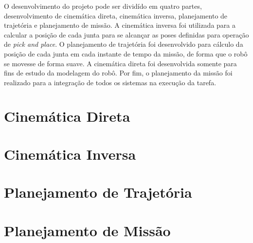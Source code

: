 O desenvolvimento do projeto pode ser dividído em quatro partes, desenvolvimento de 
cinemática direta, cinemática inversa, planejamento de trajetória e planejamento de 
missão. A cinemática inversa foi utilizada para a calcular a posição de cada junta 
para se alcançar as poses definidas para operação de \textit{pick and place}. O planejamento
de trajetória foi desenvolvido para cálculo da posição de cada junta em cada instante de tempo
da missão, de forma que o robô se movesse de forma suave. A cinemática direta foi desenvolvida
somente para fins de estudo da modelagem do robô. Por fim, o planejamento da missão foi realizado
para a integração de todos os sistemas na execução da tarefa.

\section{Cinemática Direta}

\section{Cinemática Inversa}

\section{Planejamento de Trajetória}

\section{Planejamento de Missão}

